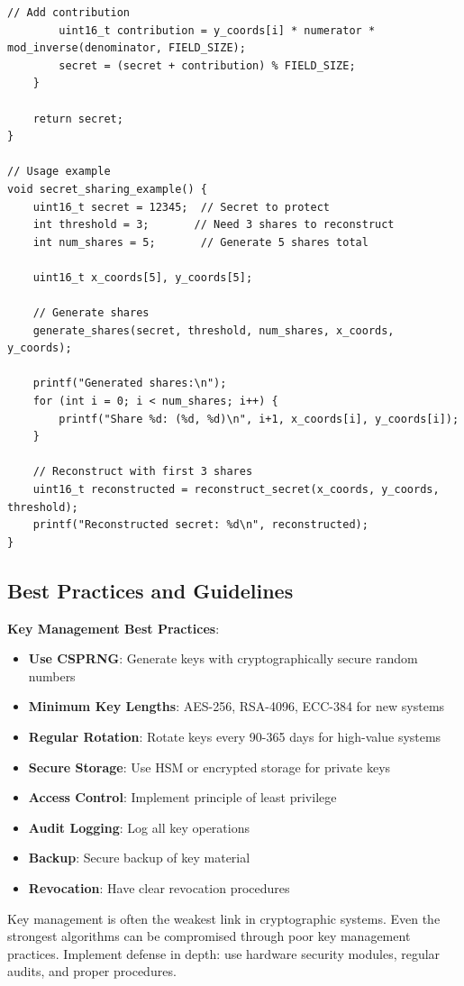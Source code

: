 \begin{lstlisting}[style=cstyle, caption={Shamir's Secret Sharing}]
        // Add contribution
        uint16_t contribution = y_coords[i] * numerator * mod_inverse(denominator, FIELD_SIZE);
        secret = (secret + contribution) % FIELD_SIZE;
    }
    
    return secret;
}

// Usage example
void secret_sharing_example() {
    uint16_t secret = 12345;  // Secret to protect
    int threshold = 3;       // Need 3 shares to reconstruct
    int num_shares = 5;       // Generate 5 shares total
    
    uint16_t x_coords[5], y_coords[5];
    
    // Generate shares
    generate_shares(secret, threshold, num_shares, x_coords, y_coords);
    
    printf("Generated shares:\n");
    for (int i = 0; i < num_shares; i++) {
        printf("Share %d: (%d, %d)\n", i+1, x_coords[i], y_coords[i]);
    }
    
    // Reconstruct with first 3 shares
    uint16_t reconstructed = reconstruct_secret(x_coords, y_coords, threshold);
    printf("Reconstructed secret: %d\n", reconstructed);
}
\end{lstlisting}

\subsection{Best Practices and Guidelines}

\textbf{Key Management Best Practices}:
\begin{itemize}
  \item \textbf{Use CSPRNG}: Generate keys with cryptographically secure random numbers
  \item \textbf{Minimum Key Lengths}: AES-256, RSA-4096, ECC-384 for new systems
  \item \textbf{Regular Rotation}: Rotate keys every 90-365 days for high-value systems
  \item \textbf{Secure Storage}: Use HSM or encrypted storage for private keys
  \item \textbf{Access Control}: Implement principle of least privilege
  \item \textbf{Audit Logging}: Log all key operations
  \item \textbf{Backup}: Secure backup of key material
  \item \textbf{Revocation}: Have clear revocation procedures
\end{itemize}

\begin{catatan}
Key management is often the weakest link in cryptographic systems. Even the strongest algorithms can be compromised through poor key management practices. Implement defense in depth: use hardware security modules, regular audits, and proper procedures.
\end{catatan}


